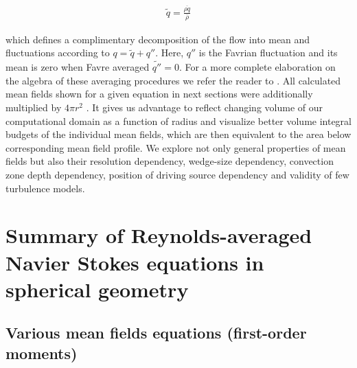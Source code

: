 \documentclass[10pt,paper=a4]{report}
\newcommand{\eht}{\overline}
\newcommand{\fht}{\widetilde}
\def\ff#1{#1''}
\begin{document}
\begin{align}
\fht{q} = \frac{\eht{\rho q}}{\eht{\rho}}
\end{align}

\noindent which defines a complimentary decomposition of the flow into mean and fluctuations according to $q = \fht{q} + \ff{q}$. Here, $\ff{q}$ is the Favrian fluctuation and its mean is zero when Favre averaged $\fht{\ff{q}} = 0$. For a more complete elaboration on the algebra of these averaging procedures we refer the reader to \citet{Chassaing2010}. All calculated mean fields shown for a given equation in next sections were additionally multiplied by $4 \pi r^2$ . It gives us advantage to reflect changing volume of our computational domain as a function of radius and visualize better volume integral budgets of the individual mean fields, which are then equivalent to the area below corresponding mean field profile. We explore not only general properties of mean fields but also their resolution dependency, wedge-size dependency, convection zone depth dependency, position of driving source dependency and validity of few turbulence models.

\newpage

\section{Summary of Reynolds-averaged Navier Stokes equations in spherical geometry}

\subsection{Various mean fields equations (first-order moments)}
\end{document}
